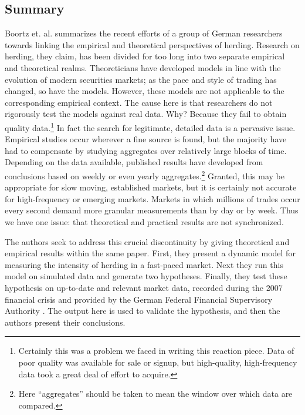 \documentclass{article}
\begin{document}
\subsection{Summary}
  Boortz et. al. summarizes the recent efforts of a group of German researchers towards linking the empirical and theoretical perspectives of herding. 
  Research on herding, they claim, has been divided for too long into two separate empirical and theoretical realms.
  Theoreticians have developed models in line with the evolution of modern securities markets; as the pace and style of trading has changed, so have the models.
  However, these models are not applicable to the corresponding empirical context.
  The cause here is that researchers do not rigorously test the models against real data.
  Why? Because they fail to obtain quality data.\footnote{
    Certainly this was a problem we faced in writing this reaction piece. Data of poor quality was available for sale or signup, but high-quality, high-frequency data took a great deal of effort to acquire.
  }
  In fact the search for legitimate, detailed data is a pervasive issue.
  Empirical studies occur wherever a fine source is found, but the majority have had to compensate by studying aggregates over relatively large blocks of time.
  Depending on the data available, published results have developed from conclusions based on weekly or even yearly aggregates.\footnote{
    Here ``aggregates'' should be taken to mean the window over which data are compared. 
  }
  Granted, this may be appropriate for slow moving, established markets, but it is certainly not accurate for high-frequency or emerging markets.
  Markets in which millions of trades occur every second demand more granular measurements than by day or by week.
  Thus we have one issue: that theoretical and practical results are not synchronized.

  The authors seek to address this crucial discontinuity by giving theoretical and empirical results within the same paper.
  First, they present a dynamic model for measuring the intensity of herding in a fast-paced market.
  Next they run this model on simulated data and generate two hypotheses.
  Finally, they test these hypothesis on up-to-date and relevant market data, recorded during the 2007 financial crisis and provided by the German Federal Financial Supervisory Authority \cite[3]{boortz}.
  The output here is used to validate the hypothesis, and then the authors present their conclusions.
\end{document}

